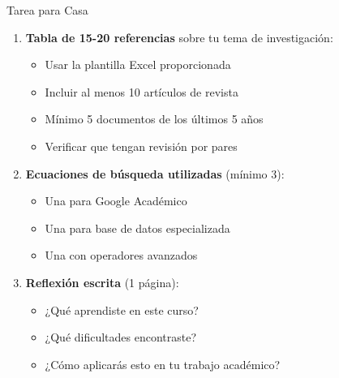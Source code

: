\documentclass[11pt,aspectratio=169]{beamer}
\begin{document}
\begin{frame}{Tarea para Casa}

	\begin{enumerate}
		\item \textbf{Tabla de 15-20 referencias} sobre tu tema de investigación:
		      \begin{itemize}
			      \item Usar la plantilla Excel proporcionada
			      \item Incluir al menos 10 artículos de revista
			      \item Mínimo 5 documentos de los últimos 5 años
			      \item Verificar que tengan revisión por pares
		      \end{itemize}

		      \vspace{0.2cm}

		\item \textbf{Ecuaciones de búsqueda utilizadas} (mínimo 3):
		      \begin{itemize}
			      \item Una para Google Académico
			      \item Una para base de datos especializada
			      \item Una con operadores avanzados
		      \end{itemize}

		      \vspace{0.2cm}

		\item \textbf{Reflexión escrita} (1 página):
		      \begin{itemize}
			      \item ¿Qué aprendiste en este curso?
			      \item ¿Qué dificultades encontraste?
			      \item ¿Cómo aplicarás esto en tu trabajo académico?
		      \end{itemize}
	\end{enumerate}
\end{frame}

\end{document}

